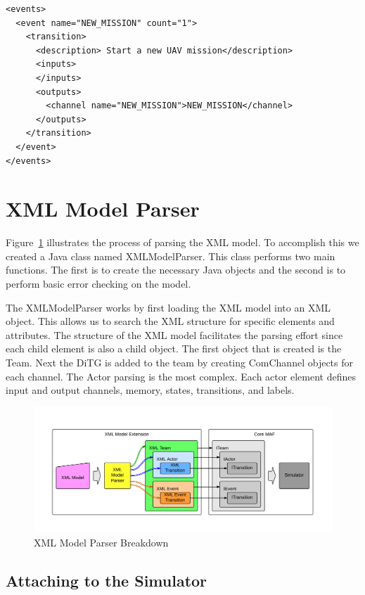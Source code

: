 \begin{lstlisting}[frame=single]
<events>
  <event name="NEW_MISSION" count="1">
    <transition>
      <description> Start a new UAV mission</description>
      <inputs>
      </inputs>
      <outputs>
        <channel name="NEW_MISSION">NEW_MISSION</channel>
      </outputs>
    </transition>
  </event>
</events>
\end{lstlisting}

\section{XML Model Parser}

Figure~\ref{fig:xml_model_extension} illustrates the process of parsing the XML model.  To accomplish this we created a Java class named XMLModelParser.  This class performs two main functions.  The first is to create the necessary Java objects and the second is to perform basic error checking on the model.  

The XMLModelParser works by first loading the XML model into an XML object.  This allows us to search the XML structure for specific elements and attributes.  The structure of the XML model facilitates the parsing effort since each child element is also a child object.  The first object that is created is the Team.  Next the DiTG is added to the team by creating ComChannel objects for each channel.  The Actor parsing is the most complex.  Each actor element defines input and output channels, memory, states, transitions, and labels.

\begin{figure}[h]
\begin{center}
\includegraphics[width=\textwidth]{xml_model_extension.png}
\caption{XML Model Parser Breakdown}
\label{fig:xml_model_extension}
\end{center}
\end{figure}

\subsection{Attaching to the Simulator}


